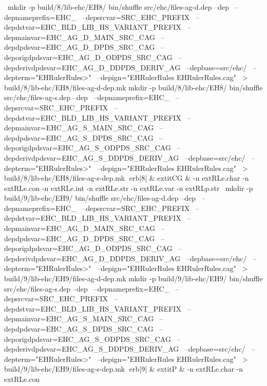 \
mkdir -p build/8/lib-ehc/EH8/
bin/shuffle src/ehc/files-ag-d.dep --dep \
	  --depnameprefix=EHC_ \
	  --depsrcvar=SRC_EHC_PREFIX \
	  --depdstvar=EHC_BLD_LIB_HS_VARIANT_PREFIX \
	  --depmainvar=EHC_AG_D_MAIN_SRC_CAG \
	  --depdpdsvar=EHC_AG_D_DPDS_SRC_CAG \
	  --deporigdpdsvar=EHC_AG_D_ODPDS_SRC_CAG \
	  --depderivdpdsvar=EHC_AG_D_DDPDS_DERIV_AG \
	  --depbase=src/ehc/ \
	  --depterm="EHRulerRules>" \
	  --depign="EHRulerRules EHRulerRules.cag" \
	    > build/8/lib-ehc/EH8/files-ag-d-dep.mk
mkdir -p build/8/lib-ehc/EH8/
bin/shuffle src/ehc/files-ag-s.dep --dep \
	  --depnameprefix=EHC_ \
	  --depsrcvar=SRC_EHC_PREFIX \
	  --depdstvar=EHC_BLD_LIB_HS_VARIANT_PREFIX \
	  --depmainvar=EHC_AG_S_MAIN_SRC_CAG \
	  --depdpdsvar=EHC_AG_S_DPDS_SRC_CAG \
	  --deporigdpdsvar=EHC_AG_S_ODPDS_SRC_CAG \
	  --depderivdpdsvar=EHC_AG_S_DDPDS_DERIV_AG \
	  --depbase=src/ehc/ \
	  --depterm="EHRulerRules>" \
	  --depign="EHRulerRules EHRulerRules.cag" \
	    > build/8/lib-ehc/EH8/files-ag-s-dep.mk
erb|8| & 	extit{CG} & 
-n 	extRL{e.char}\hspace{.5em} 
-n 	extRL{e.con}\hspace{.5em} 
-n 	extRL{e.int}\hspace{.5em} 
-n 	extRL{e.str}\hspace{.5em} 
-n 	extRL{e.var}\hspace{.5em} 
-n 	extRL{p.str}\hspace{.5em} 
\
mkdir -p build/9/lib-ehc/EH9/
bin/shuffle src/ehc/files-ag-d.dep --dep \
	  --depnameprefix=EHC_ \
	  --depsrcvar=SRC_EHC_PREFIX \
	  --depdstvar=EHC_BLD_LIB_HS_VARIANT_PREFIX \
	  --depmainvar=EHC_AG_D_MAIN_SRC_CAG \
	  --depdpdsvar=EHC_AG_D_DPDS_SRC_CAG \
	  --deporigdpdsvar=EHC_AG_D_ODPDS_SRC_CAG \
	  --depderivdpdsvar=EHC_AG_D_DDPDS_DERIV_AG \
	  --depbase=src/ehc/ \
	  --depterm="EHRulerRules>" \
	  --depign="EHRulerRules EHRulerRules.cag" \
	    > build/9/lib-ehc/EH9/files-ag-d-dep.mk
mkdir -p build/9/lib-ehc/EH9/
bin/shuffle src/ehc/files-ag-s.dep --dep \
	  --depnameprefix=EHC_ \
	  --depsrcvar=SRC_EHC_PREFIX \
	  --depdstvar=EHC_BLD_LIB_HS_VARIANT_PREFIX \
	  --depmainvar=EHC_AG_S_MAIN_SRC_CAG \
	  --depdpdsvar=EHC_AG_S_DPDS_SRC_CAG \
	  --deporigdpdsvar=EHC_AG_S_ODPDS_SRC_CAG \
	  --depderivdpdsvar=EHC_AG_S_DDPDS_DERIV_AG \
	  --depbase=src/ehc/ \
	  --depterm="EHRulerRules>" \
	  --depign="EHRulerRules EHRulerRules.cag" \
	    > build/9/lib-ehc/EH9/files-ag-s-dep.mk
erb|9| & 	extit{P} & 
-n 	extRL{e.char}\hspace{.5em} 
-n 	extRL{e.con}\hspace{.5em} 
